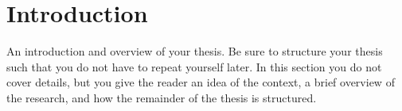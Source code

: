\chapter{Introduction}
An introduction and overview of your thesis. Be sure to structure your thesis
such that you do not have to repeat yourself later. In this section you do not
cover details, but you give the reader an idea of the context, a brief overview
of the research, and how the remainder of the thesis is structured.
